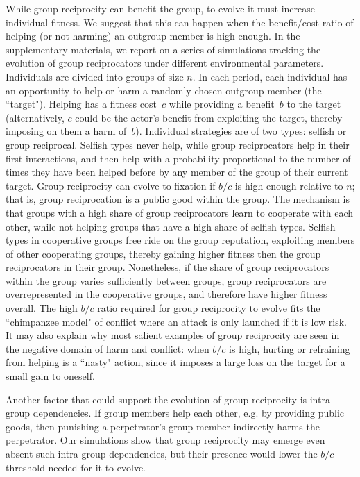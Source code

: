 \documentclass[12pt,a4paper]{article}\usepackage[]{graphicx}\usepackage[]{color}
\begin{document}
While group reciprocity can benefit the group, to evolve it must increase individual fitness. We suggest that this can
happen when the benefit/cost ratio of helping (or not harming) an outgroup member is high enough. In the
supplementary materials, we report on a series of simulations tracking the evolution of group reciprocators under different
environmental parameters. Individuals are divided into groups of size $n$. In each period, each individual has an 
opportunity to help or harm a randomly chosen outgroup member (the ``target"). Helping has a fitness cost~$c$ while 
providing a benefit~$b$ to the target (alternatively, $c$ could be the actor's benefit from exploiting the target, thereby
imposing on them a harm of~$b$). Individual strategies are of two types: selfish or group reciprocal.
Selfish types never help, while group reciprocators help in their first interactions, and then help with a probability
proportional to the number of times they have been helped before by any member of the group of their current target.  
Group reciprocity can evolve to fixation if $b/c$ is high enough relative to $n$; 
that is, group reciprocation is a public good within the group. The mechanism is that groups with a high share of group
reciprocators learn to cooperate with each other, while not helping groups that have a high share of selfish types. 
Selfish types in cooperative groups free ride on the group reputation,
exploiting members of other cooperating groups, thereby gaining higher fitness then the group reciprocators in their group.
Nonetheless, if the share of group reciprocators within the group varies sufficiently between groups, group reciprocators 
are overrepresented in the cooperative groups, and therefore have higher fitness overall. The high $b/c$ ratio required for
group reciprocity to evolve fits the ``chimpanzee model" of conflict where an attack is 
only launched if it is low risk. It may also explain why most salient examples of group reciprocity are seen in the
negative domain of harm and conflict: when $b/c$ is high, hurting or refraining from helping is a ``nasty" action, 
since it imposes a large loss on the target for a small gain to oneself.

Another factor that could support the evolution of group reciprocity is intra-group dependencies. If group members help 
each other, e.g. by providing public goods, then punishing a perpetrator's group member indirectly harms the perpetrator.
Our simulations show that group reciprocity may emerge even absent such intra-group dependencies, but their presence
would lower the $b/c$ threshold needed for it to evolve.
\end{document}
